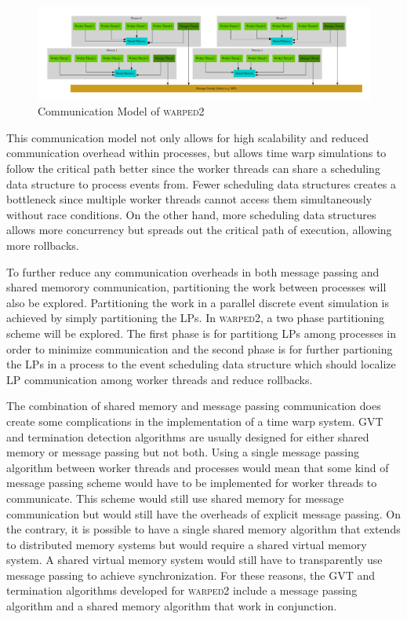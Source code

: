 \documentclass[11pt]{book}
\begin{document}
\begin{figure}[H]
    \centering
    \includegraphics[width=\textwidth]{figs/graphviz/warped_communication.pdf}
    \caption{Communication Model of \textsc{warped2}}\label{warped2_communication}
\end{figure}

\noindent
This communication model not only allows for high scalability and reduced communication
overhead within processes, but allows time warp simulations to follow the critical path better
since the worker threads can share a scheduling data structure to process events from.
Fewer scheduling data structures creates a bottleneck since multiple worker threads cannot
access them simultaneously without race conditions. On the other hand, more scheduling
data structures allows more concurrency but spreads out the critical path of execution,
allowing more rollbacks.

To further reduce any communication overheads in both message passing and shared memorory
communication, partitioning the work between processes will also be explored. Partitioning
the work in a parallel discrete event simulation is achieved by simply partitioning the
LPs. In \textsc{warped2}, a two phase partitioning scheme will be explored. The first phase
is for partitiong LPs among processes in order to minimize communication and the second
phase is for further partioning the LPs in a process to the event scheduling data structure
which should localize LP communication among worker threads and reduce rollbacks.

The combination of shared memory and message passing communication does create some
complications in the implementation of a time warp system. GVT and termination detection
algorithms are usually designed for either shared memory or message passing but not both.
Using a single message passing algorithm between worker threads and processes would mean
that some kind of message passing scheme would have to be implemented for worker threads
to communicate. This scheme would still use shared memory for message communication but
would still have the overheads of explicit message passing. On the contrary, it is possible
to have a single shared memory algorithm that extends to distributed memory systems but
would require a shared virtual memory system. A shared virtual memory system would still
have to transparently use message passing to achieve synchronization. For these reasons,
the GVT and termination algorithms developed for \textsc{warped2} include a message
passing algorithm and a shared memory algorithm that work in conjunction.
\end{document}
